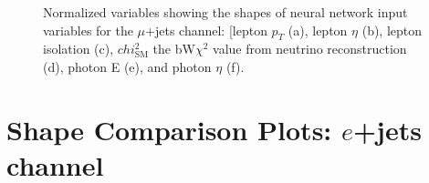 \begin{figure}[h!]
\vspace{-4.5mm}
\hfil
{}
\caption{Normalized variables showing the shapes of neural network input variables for the $\mu$+jets channel: [lepton $p_T$ (a), lepton $\eta$ (b), lepton isolation (c), $chi^2_{\text{SM}}$ the bW$\chi^2$ value from neutrino reconstruction (d), photon E (e), and photon $\eta$ (f).}
\label{fig:VarPlots5}
\end{figure}

\section{Shape Comparison Plots: $e$+jets channel}

